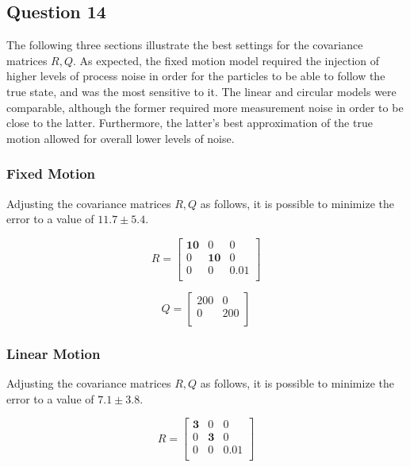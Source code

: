 \subsection{Question 14}

The following three sections illustrate the best settings for the covariance matrices $R, Q$.
As expected, the fixed motion model required the injection of higher levels of process noise in order for the particles to be able to
follow the true state, and was the most sensitive to it.
The linear and circular models were comparable, although the former required more measurement noise in order to be close to the latter.
Furthermore, the latter's best approximation of the true motion allowed for overall lower levels of noise. 

	\subsubsection{Fixed Motion}
	
	Adjusting the covariance matrices $R,Q$ as follows, it is possible to minimize the error to a value of $11.7 \pm 5.4$.
	
		\[
	R =
	\begin{bmatrix}
	    \mathbf{10} 		& 0		& 0 \\
	    0	    & \mathbf{10} 	& 0 \\
	    0     	& 0 	& 0.01 \\
	
	\end{bmatrix}
	\]
	
	
	\[
	Q =
	\begin{bmatrix}
	    200  & 0 \\
	    0    & 200 \\
	
	\end{bmatrix}
	\]
	
	
	\subsubsection{Linear Motion}
	
	Adjusting the covariance matrices $R,Q$ as follows, it is possible to minimize the error to a value of $7.1 \pm 3.8$.
	
		\[
	R =
	\begin{bmatrix}
	    \mathbf{3}       & 0		& 0 \\
	    0       & \mathbf{3} 	& 0 \\
	    0       & 0 	& 0.01 \\
	
	\end{bmatrix}
	\]
	
